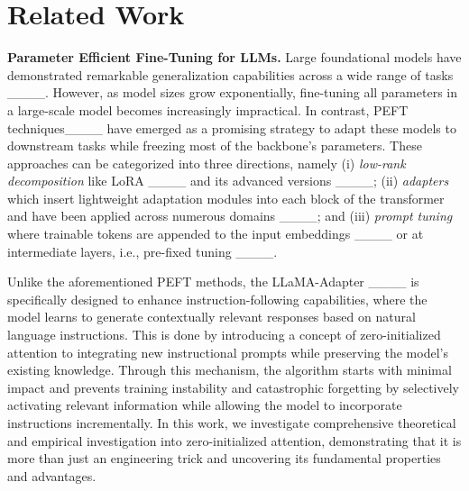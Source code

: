 \section{Related Work}
\label{section:related_work}

\textbf{Parameter Efficient Fine-Tuning for LLMs.} Large foundational models have demonstrated remarkable generalization capabilities across a wide range of tasks ____. 
However, as model sizes grow exponentially, fine-tuning all parameters in a large-scale model becomes increasingly impractical. In contrast, PEFT techniques____ have emerged as a promising strategy to adapt these models to downstream tasks while freezing most of the backbone’s parameters. These approaches can be categorized into three directions, namely (i) \textit{low-rank decomposition} like LoRA ____ and its advanced versions ____; (ii) \textit{adapters} which insert
lightweight adaptation modules into each block of the transformer and have been applied across
numerous domains ____; and (iii) \textit{prompt tuning} where trainable tokens are appended to the input embeddings ____ or at intermediate layers, i.e., pre-fixed tuning ____. 

Unlike the aforementioned PEFT methods, the LLaMA-Adapter ____ is specifically designed to enhance instruction-following capabilities, where the model learns to generate contextually relevant responses based on natural language instructions. This is done by introducing a concept of zero-initialized attention to integrating new instructional prompts while preserving the model’s existing knowledge.  Through this mechanism, the algorithm starts with minimal impact and prevents training instability and catastrophic forgetting by selectively activating relevant information while allowing the model to incorporate instructions incrementally. In this work, we investigate comprehensive theoretical and empirical investigation into zero-initialized attention, demonstrating that it is more than just an engineering trick and uncovering its fundamental properties and advantages.
 


